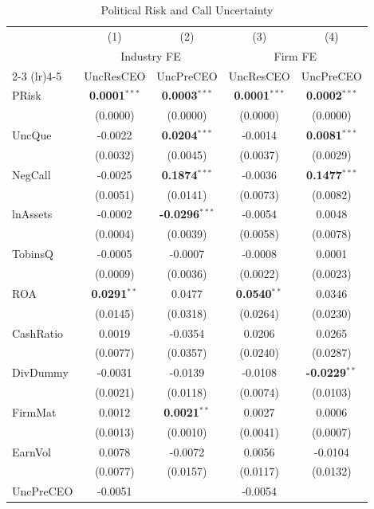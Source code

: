 \documentclass[11pt,a4paper]{article}
\begin{document}
\clearpage
\begin{table}[htbp]
\centering
\caption{Political Risk and Call Uncertainty}
\label{tab:h11_prisk_uncertainty}
\scriptsize
\begin{tabular}{lcccc}
\toprule
 & (1) & (2) & (3) & (4) \\
 & \multicolumn{2}{c}{Industry FE} & \multicolumn{2}{c}{Firm FE} \\
\cmidrule(lr){2-3} \cmidrule(lr){4-5}
 & UncResCEO & UncPreCEO & UncResCEO & UncPreCEO \\
\midrule
PRisk & \textbf{0.0001}$^{***}$ & \textbf{0.0003}$^{***}$ & \textbf{0.0001}$^{***}$ & \textbf{0.0002}$^{***}$ \\
 & (0.0000) & (0.0000) & (0.0000) & (0.0000) \\
\midrule
UncQue & -0.0022 & \textbf{0.0204}$^{***}$ & -0.0014 & \textbf{0.0081}$^{***}$ \\
 & (0.0032) & (0.0045) & (0.0037) & (0.0029) \\
NegCall & -0.0025 & \textbf{0.1874}$^{***}$ & -0.0036 & \textbf{0.1477}$^{***}$ \\
 & (0.0051) & (0.0141) & (0.0073) & (0.0082) \\
lnAssets & -0.0002 & \textbf{-0.0296}$^{***}$ & -0.0054 & 0.0048 \\
 & (0.0004) & (0.0039) & (0.0058) & (0.0078) \\
TobinsQ & -0.0005 & -0.0007 & -0.0008 & 0.0001 \\
 & (0.0009) & (0.0036) & (0.0022) & (0.0023) \\
ROA & \textbf{0.0291}$^{**}$ & 0.0477 & \textbf{0.0540}$^{**}$ & 0.0346 \\
 & (0.0145) & (0.0318) & (0.0264) & (0.0230) \\
CashRatio & 0.0019 & -0.0354 & 0.0206 & 0.0265 \\
 & (0.0077) & (0.0357) & (0.0240) & (0.0287) \\
DivDummy & -0.0031 & -0.0139 & -0.0108 & \textbf{-0.0229}$^{**}$ \\
 & (0.0021) & (0.0118) & (0.0074) & (0.0103) \\
FirmMat & 0.0012 & \textbf{0.0021}$^{**}$ & 0.0027 & 0.0006 \\
 & (0.0013) & (0.0010) & (0.0041) & (0.0007) \\
EarnVol & 0.0078 & -0.0072 & 0.0056 & -0.0104 \\
 & (0.0077) & (0.0157) & (0.0117) & (0.0132) \\
UncPreCEO & -0.0051 &  & -0.0054 &  \\

\end{tabular}
\end{table}
\end{document}
